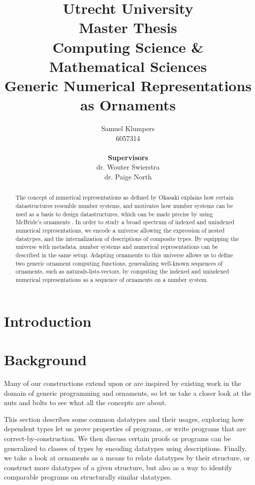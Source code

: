 \documentclass[10pt, final]{article}
\title{\large Utrecht University \\ Master Thesis \\ Computing Science \& Mathematical Sciences \\ \Large Generic Numerical Representations as Ornaments}
\author{Samuel Klumpers\\6057314\\ \\ \textbf{Supervisors} \\ dr. Wouter Swierstra \\ dr. Paige North}
\theoremstyle{plain}
\theoremstyle{definition}
\begin{document}
\maketitle

\newpage
\begin{abstract}
The concept of numerical representations as defined by Okasaki \cite{purelyfunctional} explains how certain datastructures resemble number systems, and motivates how number systems can be used as a basis to design datastructures, which can be made precise by using McBride's ornaments \cite{algorn}. In order to study a broad spectrum of indexed and unindexed numerical representations, we encode a universe allowing the expression of nested datatypes, and the internalization of descriptions of composite types. By equipping the universe with metadata, number systems and numerical representations can be described in the same setup. Adapting ornaments to this universe allows us to define two generic ornament computing functions, generalizing well-known sequences of ornaments, such as naturals-lists-vectors, by computing the indexed and unindexed numerical representations as a sequence of ornaments on a number system.
\end{abstract}


\newpage
\begin{small}
\tableofcontents
\end{small}
\newpage

\section{Introduction}\label{sec:introduction}



\section{Background}\label{part:background}
Many of our constructions extend upon or are inspired by existing work in the domain of generic programming and ornaments, so let us take a closer look at the nuts and bolts to see what all the concepts are about.

This section describes some common datatypes and their usages, exploring how dependent types let us prove properties of programs, or write programs that are correct-by-construction. We then discuss certain proofs or programs can be generalized to classes of types by encoding datatypes using descriptions. Finally, we take a look at ornaments as a means to relate datatypes by their structure, or construct more datatypes of a given structure, but also as a way to identify comparable programs on structurally similar datatypes.
\end{document}
